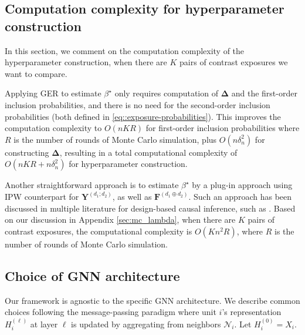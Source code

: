 \documentclass[twoside,letterpaper]{article}
\theoremstyle{plain}
\theoremstyle{definition}
\theoremstyle{remark}
\newcommand{\bY}{\boldsymbol{Y}}
\newcommand{\bF}{\boldsymbol{F}}
\newcommand{\bDelta}{\boldsymbol{\Delta}}
\newcommand{\cN}{\mathcal{N}}
\newcommand{\bFaug}{\bF^{(d_1\oplus d_2)}}
\begin{document}
\subsection{Computation complexity for hyperparameter construction}\label{sec:computation}

In this section, we comment on the computation complexity of the hyperparameter construction, when there are $K$ pairs of contrast exposures we want to compare.

Applying GER to estimate $\beta^\star$ only requires computation of $\bDelta$ and the first-order inclusion probabilities, and there is no need for the second-order inclusion probabilities (both defined in \eqref{eq::exposure-probabilities}). This improves the computation complexity to $O(nKR)$ for first-order inclusion probabilities where $R$ is the number of rounds of Monte Carlo simulation, plus $O(n \delta_n^2)$ for constructing $\bDelta$, resulting in a total computational complexity of $O(nKR + n \delta_n^2)$ for hyperparameter construction.

Another straightforward approach is to estimate $\beta^\star$ by a plug-in approach using IPW counterpart for $\bY^{(d_1;d_2)}$, as well as $\bFaug$. Such an approach has been discussed in multiple literature for design-based causal inference, such as \citet{middleton2018unified, chang2023design, lu2025design}. Based on our discussion in Appendix \ref{sec:mc_lambda}, when there are $K$ pairs of contrast exposures, the computational complexity is $O(K n^2 R)$, where $R$ is the number of rounds of Monte Carlo simulation. 

\subsection{Choice of GNN architecture}\label{sec:gnn_choices}

Our framework is agnostic to the specific GNN architecture. We describe common choices following the message-passing paradigm where unit $i$'s representation $H_i^{(\ell)}$ at layer $\ell$ is updated by aggregating from neighbors $\cN_i$. Let $H_i^{(0)} = X_i$.
\end{document}
